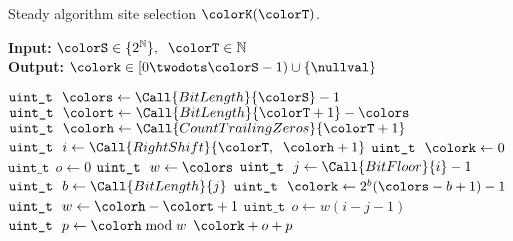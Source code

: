 \begin{algorithm}[H]
\caption{Steady algorithm site selection $\colorK(\colorT)$.}
\label{alg:steady-site-selection}
\begin{minipage}{0.5\textwidth}
    \hspace*{\algorithmicindent} \textbf{Input:} $\colorS \in \{2^{\mathbb{N}}\},\;\; \colorT \in \mathbb{N}$ \\
    \hspace*{\algorithmicindent} \textbf{Output:} $\colork \in [0 \twodots \colorS - 1) \cup \{\nullval\}$ 
    \begin{algorithmic}[1]
        \State $\texttt{uint\_t} ~ ~ \colors \gets \Call{BitLength}{\colorS} - 1$
        \State $\texttt{uint\_t} ~ ~ \colort \gets \Call{BitLength}{\colorT+1} - \colors $ 
        \State $\texttt{uint\_t} ~ ~ \colorh \gets \Call{CountTrailingZeros}{\colorT + 1}$ 
         
        \State \Return \nullval {}
        \EndIf
        \State $\texttt{uint\_t} ~ ~ i \gets \Call{RightShift}{\colorT, \;\; \colorh + 1}$ 
         
        \State $\texttt{uint\_t} ~ ~ \colork \gets 0$ 
        \State $\texttt{uint\_t} ~ ~ o \gets 0$ 
        \State $\texttt{uint\_t} ~ ~ w \gets \colors$ 
        \Else
        \State $\texttt{uint\_t} ~ ~ j \gets \Call{BitFloor}{i} - 1$ 
        \State $\texttt{uint\_t} ~ ~ b \gets \Call{BitLength}{j}$ 
        \State $\texttt{uint\_t} ~ ~ \colork \gets 2^{b}(\colors - b + 1) - 1$ 
        \State $\texttt{uint\_t} ~ ~ w \gets \colorh - \colort + 1$ 
        \State $\texttt{uint\_t} ~ ~ o \gets w (i - j - 1)$ 
        \EndIf
        \State $\texttt{uint\_t} ~ ~ p \gets \colorh \bmod w$ 
        \State \Return $\colork + o + p$ 
    \end{algorithmic}
\end{minipage}
\end{algorithm}
